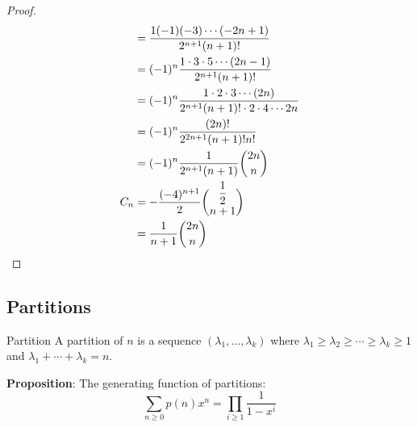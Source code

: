 \documentclass{report}
\begin{document}
\begin{proof}
\begin{align*}
                                                                          &= \dfrac{1(-1)(-3)\cdots (-2n + 1)}{2^{n + 1}(n + 1)!}                                         \\
                                                                          &= (-1)^{n}\dfrac{1 \cdot 3 \cdot 5 \cdots (2n - 1)}{2^{n + 1}(n + 1)!}                         \\
                                                                          &= (-1)^{n}\dfrac{1 \cdot 2 \cdot 3 \cdots (2n)}{2^{n + 1}(n + 1)! \cdot 2 \cdot 4 \cdots 2n}   \\
                                                                          &= (-1)^{n}\dfrac{(2n)!}{2^{2n + 1}(n + 1)!n!}                                                  \\
                                                                          &= (-1)^{n}\dfrac{1}{2^{n + 1}(n + 1)}\dbinom{2n}{n}                                            \\
                 C_{n}                                                    &= -\dfrac{(-4)^{n + 1}}{2}\dbinom{\dfrac{1}{2}}{n + 1}                                         \\
                                                                          &= \dfrac{1}{n + 1}\dbinom{2n}{n}                                                                 
             \end{align*}
    \end{proof}

\begin{topic}
    \section{Partitions}
\end{topic}

\begin{definition}{Partition}
    A partition of $n$ is a sequence $(\lambda_{1}, \ldots , \lambda_{k})$ where $\lambda_{1} \geq \lambda_{2} \geq \cdots \geq \lambda_{k} \geq 1$ and $\lambda_{1} + \cdots + \lambda_{k} = n$. 
\end{definition}

\textbf{Proposition}: The generating function of partitions:
    \begin{equation*}
        \sum_{n \geq 0}p(n)x^{n} = \prod_{i \geq 1}\dfrac{1}{1 - x^{i}}
    \end{equation*}
\end{document}
